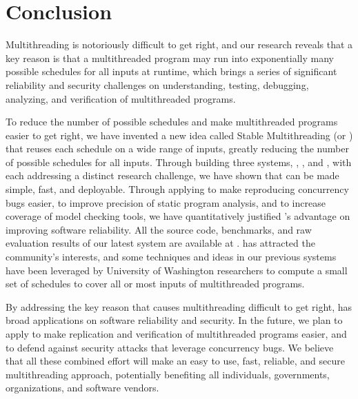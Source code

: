 \chapter{Conclusion} \label{sec:conclusion}

Multithreading is notoriously difficult to get right, and our research reveals
that a key reason is that a multithreaded program may run into exponentially 
many
possible schedules for all inputs at runtime, which brings a series of
significant reliability and security challenges on understanding,
testing, debugging, analyzing, and verification of multithreaded
programs.

To reduce the number of possible schedules and make multithreaded
programs easier to get right, we have invented a new idea called Stable
Multithreading (or \smt) that reuses each schedule on a wide range of inputs,
greatly reducing the number of possible schedules for all inputs. Through
building three \smt systems, \tern, \peregrine, and \parrot, with each 
addressing
a distinct research challenge, we have shown that \smt can be made simple, fast,
and deployable. Through applying \smt to make reproducing concurrency bugs
easier, to improve precision of static program analysis, and to increase
coverage of model checking tools, we have quantitatively justified \smt's 
advantage on improving software reliability. All the source code,
benchmarks, and raw evaluation results of our latest \smt system \parrot are
available at \github. \smt has attracted the community's interests, and some 
techniques and ideas in our previous systems have been leveraged by 
University of Washington researchers to compute a small set of schedules to 
cover all or most inputs of multithreaded programs.

By addressing the key reason that causes multithreading difficult to get right,
\smt has broad applications on software reliability and security. In the 
future, we plan to apply \smt to make replication and verification of 
multithreaded programs easier, and to defend against security attacks 
that leverage concurrency bugs. We believe that all these combined effort will 
make \smt an easy to use, fast, reliable, and secure multithreading approach, 
potentially benefiting all individuals, governments, organizations, and software 
vendors. 